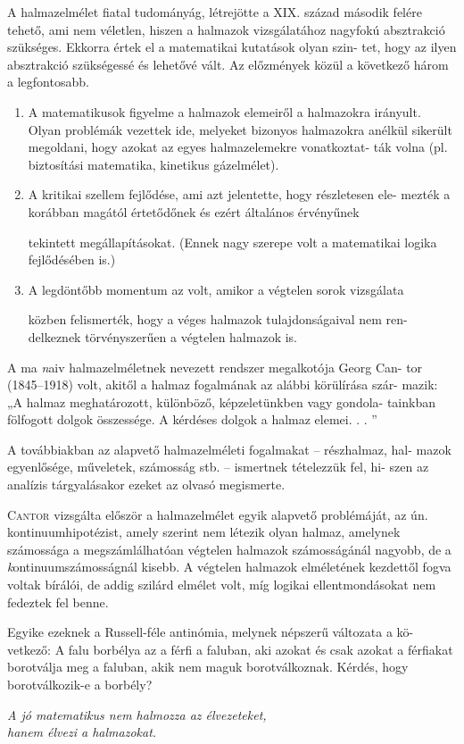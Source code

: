 \documentclass[12pt, a4paper]{article}
\begin{document}
A halmazelmélet fiatal tudományág, létrejötte a XIX. század második
felére tehető, ami nem véletlen, hiszen a halmazok vizsgálatához nagyfokú
absztrakció szükséges. Ekkorra értek el a matematikai kutatások olyan szin-
tet, hogy az ilyen absztrakció szükségessé és lehetővé vált. Az előzmények
közül a következő három a legfontosabb.
\begin{enumerate}
    \item A matematikusok figyelme a halmazok elemeiről a halmazokra irányult.
    Olyan problémák vezettek ide, melyeket bizonyos halmazokra anélkül
    sikerült megoldani, hogy azokat az egyes halmazelemekre vonatkoztat-
    ták volna (pl. biztosítási matematika, kinetikus gázelmélet).
    \item A kritikai szellem fejlődése, ami azt jelentette, hogy részletesen ele-
    mezték a korábban magától értetődőnek és ezért általános érvényűnek
    
    tekintett megállapításokat. (Ennek nagy szerepe volt a matematikai
    logika fejlődésében is.)
    \item A legdöntőbb momentum az volt, amikor a végtelen sorok vizsgálata

    közben felismerték, hogy a véges halmazok tulajdonságaival nem ren-
    delkeznek törvényszerűen a végtelen halmazok is.
\end{enumerate}

A ma {\emph naiv halmazelméletnek} nevezett rendszer megalkotója Georg Can-
tor (1845–1918) volt, akitől a halmaz fogalmának az alábbi körülírása szár-
mazik: „A halmaz meghatározott, különböző, képzeletünkben vagy gondola-
tainkban fölfogott dolgok összessége. A kérdéses dolgok a halmaz elemei. . . ”

A továbbiakban az alapvető halmazelméleti fogalmakat – részhalmaz, hal-
mazok egyenlősége, műveletek, számosság stb. – ismertnek tételezzük fel, hi-
szen az analízis tárgyalásakor ezeket az olvasó megismerte.

{\scshape Cantor} vizsgálta először a halmazelmélet egyik alapvető problémáját, az
ún. kontinuumhipotézist, amely szerint nem létezik olyan halmaz, amelynek
számossága a megszámlálhatóan végtelen halmazok számosságánál nagyobb,
de a {\emph kontinuumszámosságnál } kisebb.
\bigskip
A végtelen halmazok elméletének kezdettől fogva voltak bírálói, de addig
szilárd elmélet volt, míg logikai ellentmondásokat nem fedeztek fel benne.

Egyike ezeknek a Russell-féle antinómia, melynek népszerű változata a kö-
vetkező: {\rmfamily A falu borbélya az a férfi a faluban, aki azokat és csak azokat a férfiakat borotválja meg a faluban, akik nem maguk borotválkoznak. Kérdés, hogy borotválkozik-e a borbély? }
\begin{flushright}
    \emph{\footnotesize{A jó matematikus nem halmozza az élvezeteket,\\ hanem élvezi a halmazokat.}}
\end{flushright}
\end{document}
